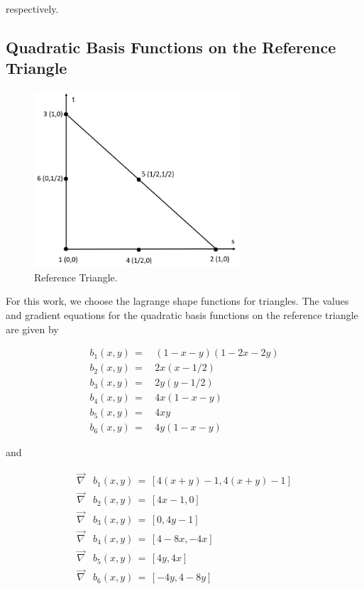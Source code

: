 \documentclass[11pt]{article}
\begin{document}
\noindent respectively.

\subsection{Quadratic Basis Functions on the Reference Triangle}
\label{sec::triref_quadratic}


\begin{figure}[hbt]
\centering
	\includegraphics[width=3.0in]{./Figures/ref_triangle.jpg}
	\caption{Reference Triangle.}
\hspace{0.5cm}
\label{fig::ref_triangle}
\end{figure}

For this work, we choose the lagrange shape functions for triangles. The values and gradient equations for the quadratic basis functions on the reference triangle are given by

\begin{equation}
\label{eq::reftri_quad_basis_vals}
\begin{aligned}
b_1(x,y) \, =& \, (1-x-y) (1-2x-2y) \\
b_2(x,y) \, =& \, 2x(x-1/2) \\
b_3(x,y) \, =& \, 2y(y-1/2) \\
b_4(x,y) \, =& \, 4x (1-x-y) \\
b_5(x,y) \, =& \, 4xy\\
b_6(x,y) \, =& \, 4y (1-x-y)
\end{aligned}
\end{equation}

\noindent and

\begin{equation}
\label{eq::reftri_quad_basis_grads}
\begin{aligned}
\vec{\nabla}& b_1(x,y) \, = \, \left[ 4(x+y)-1 , 4(x+y)-1   \right] \\
\vec{\nabla}& b_2(x,y) \, = \, \left[ 4x-1, 0   \right] \\
\vec{\nabla}& b_3(x,y) \, = \, \left[ 0, 4y-1   \right] \\
\vec{\nabla}& b_4(x,y) \, = \, \left[ 4-8x, -4x   \right] \\
\vec{\nabla}& b_5(x,y) \, = \, \left[ 4y, 4x   \right] \\
\vec{\nabla}& b_6(x,y) \, = \, \left[ -4y, 4-8y   \right] 
\end{aligned}
\end{equation}
\end{document}
